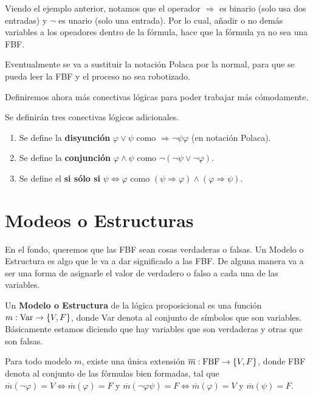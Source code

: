\documentclass[12pt]{report}
\theoremstyle{largebreak}
\newcommand\cf[3]{\ensuremath{#1:#2\rightarrow#3}}
\begin{document}
    Viendo el ejemplo anterior, notamos que el operador $\Rightarrow$ es binario (solo usa dos entradas) y $\neg$ es unario (solo una entrada). Por lo cual, añadir o no demás variables a los opeadores dentro de la fórmula, hace que la fórmula ya no sea una FBF.

    \begin{obs}
        Eventualmente se va a sustituir la notación Polaca por la normal, para que se pueda leer la FBF y el proceso no sea robotizado.
    \end{obs}

    Definiremos ahora más conectivas lógicas para poder trabajar más cómodamente.

    \begin{mydef}
        Se definirán tres conectivas lógicos adicionales.
        \begin{enumerate}
            \item Se define la \textbf{disyunción} $\varphi\lor\psi$ como $\Rightarrow\neg\psi\varphi$ (en notación Polaca).
            \item Se define la \textbf{conjunción} $\varphi\land\psi$ como $\neg(\neg\psi\lor\neg\varphi)$.
            \item Se define el \textbf{si sólo si} $\psi\iff\varphi$ como $(\psi\Rightarrow\varphi)\land(\varphi\Rightarrow\psi)$.
        \end{enumerate}
    \end{mydef}

    \section{Modeos o Estructuras}

    En el fondo, queremos que las FBF sean cosas verdaderas o falsas. Un Modelo o Estructura es algo que le va a dar significado a las FBF. De alguna manera va a ser una forma de asignarle el valor de verdadero o falso a cada una de las variables.

    \begin{mydef}
        Un \textbf{Modelo o Estructura} de la lógica proposicional es una función $\cf{m}{\textup{Var}}{\left\{V,F\right\}}$, donde Var denota al conjunto de símbolos que son variables. Básicamente estamos diciendo que hay variables que son verdaderas y otras que son falsas.
    \end{mydef}

    \begin{theor}
        Para todo modelo $m$, existe una única extensión $\cf{\overline{m}}{\textup{FBF}}{\left\{V,F\right\}}$, donde FBF denota al conjunto de las fórmulas bien formadas, tal que $\overline{m}(\neg\varphi)=V\iff \overline{m}(\varphi)=F$ y $\overline{m}(\neg\varphi\psi)=F\iff\overline{m}(\varphi)=V$ y $\overline{m}(\psi)=F$.
    \end{theor}
\end{document}
